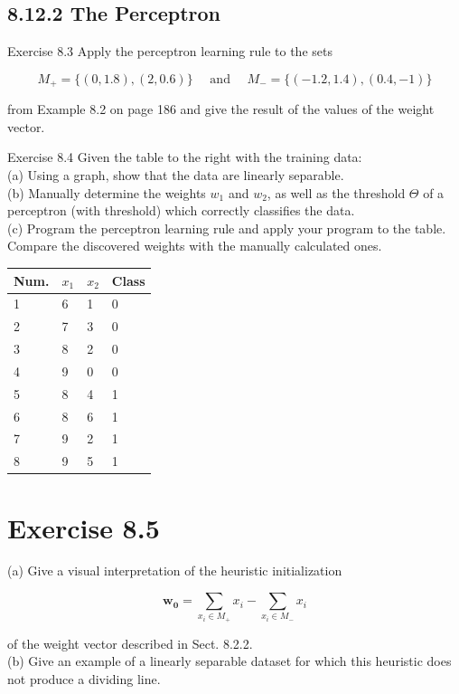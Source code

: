 \documentclass[10pt]{article}
\begin{document}
\subsection*{8.12.2 The Perceptron}
Exercise 8.3 Apply the perceptron learning rule to the sets


$$
M_{+}=\{(0,1.8),(2,0.6)\} \quad \text { and } \quad M_{-}=\{(-1.2,1.4),(0.4,-1)\}
$$

from Example 8.2 on page 186 and give the result of the values of the weight vector.

Exercise 8.4 Given the table to the right with the training data:\\
(a) Using a graph, show that the data are linearly separable.\\
(b) Manually determine the weights $w_{1}$ and $w_{2}$, as well as the threshold $\Theta$ of a perceptron (with threshold) which correctly classifies the data.\\
(c) Program the perceptron learning rule and apply your program to the table. Compare the discovered weights with the manually calculated ones.

\begin{center}
\begin{tabular}{llll}
\hline
Num. & $x_{1}$ & $x_{2}$ & Class \\
\hline
1 & 6 & 1 & 0 \\
\hline
2 & 7 & 3 & 0 \\
\hline
3 & 8 & 2 & 0 \\
\hline
4 & 9 & 0 & 0 \\
\hline
5 & 8 & 4 & 1 \\
\hline
6 & 8 & 6 & 1 \\
\hline
7 & 9 & 2 & 1 \\
\hline
8 & 9 & 5 & 1 \\
\hline
\end{tabular}
\end{center}

\section*{Exercise 8.5}
(a) Give a visual interpretation of the heuristic initialization

$$
\boldsymbol{w}_{\mathbf{0}}=\sum_{x_{i} \in M_{+}} x_{i}-\sum_{x_{i} \in M_{-}} x_{i}
$$

of the weight vector described in Sect. 8.2.2.\\
(b) Give an example of a linearly separable dataset for which this heuristic does not produce a dividing line.
\end{document}
